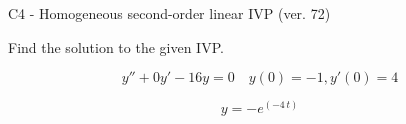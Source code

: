 \begin{exercise}
  \begin{exerciseTitle}C4 - Homogeneous second-order linear IVP (ver. 72)\end{exerciseTitle}
  \begin{exerciseStatement}
    
Find the solution to the given IVP.

    
\[y''+0y'-16y = 0 \hspace{1em} y(0) = -1 , y'(0) = 4\]

  \end{exerciseStatement}
  \begin{exerciseAnswer}
    
\[y= -e^{\left(-4 \, t\right)}\]

  \end{exerciseAnswer}
\end{exercise}